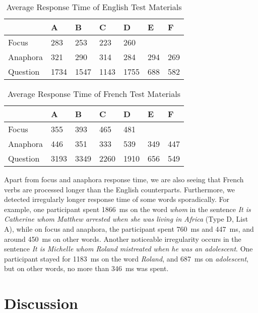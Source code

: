 \begin{table}[htb]\caption{Average Response Time of English Test Materials}\label{tb:rt_en}
    \centering
    \begin{tabular}{lllllll}
        \toprule
        & A & B & C & D & E & F \\
        \midrule
        Focus & 283 & 253 & 223 & 260 \\
        Anaphora &  321 & 290 & 314 & 284 & 294 & 269 \\
        Question & 1734 & 1547 & 1143 & 1755 & 688 & 582 \\
        \bottomrule
    \end{tabular}
\end{table}

\begin{table}[htb]\caption{Average Response Time of French Test Materials}\label{tb:rt_fr}
    \centering
    \begin{tabular}{lllllll}
        \toprule
        & A & B & C & D & E & F \\
        \midrule
        Focus & 355 & 393 & 465 & 481 \\
        Anaphora & 446 & 351 & 333 & 539 & 349 & 447 \\
        Question & 3193 & 3349 & 2260 & 1910 & 656 & 549 \\
        \bottomrule
    \end{tabular}
\end{table}

Apart from focus and anaphora response time, we are also seeing that French verbs are processed longer than the English counterparts. Furthermore, we detected irregularly longer response time of some words sporadically.  For example, one participant spent \SI{1866}{ms} on the word \emph{whom} in the sentence \emph{It is Catherine whom Matthew arrested when she was living in Africa} (Type D, List A), while on focus and anaphora, the participant spent \SI{760}{ms} and \SI{447}{ms}, and around \SI{450}{ms} on other words. Another noticeable irregularity occurs in the sentence \emph{It is Michelle whom Roland mistreated when he was an adolescent}. One participant stayed for \SI{1183}{ms} on the word \emph{Roland}, and \SI{687}{ms} on \emph{adolescent}, but on other words, no more than \SI{346}{ms} was spent. 

\section{Discussion}
